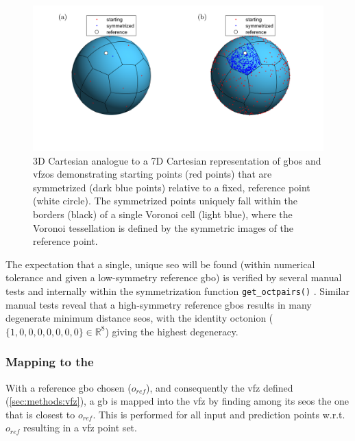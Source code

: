 \documentclass[preprint,12pt]{elsarticle}
\newcommand{\startpt}{red points}
\newcommand{\sympt}{dark blue points}
\newcommand{\refpt}{white circle}
\newcommand{\vbordercolor}{black}
\newcommand{\vcellcolor}{light blue}
\begin{document}
\begin{figure}
    \centering
    \includegraphics[scale=1]{voronoi.png}
    \caption{3D Cartesian analogue to a 7D Cartesian representation of \glspl{gbo} and \glspl{vfzo} demonstrating starting points (\startpt) that are symmetrized (\sympt) relative to a fixed, reference point (\refpt). The symmetrized points uniquely fall within the borders (\vbordercolor) of a single Voronoi cell (\vcellcolor), where the Voronoi tessellation is defined by the symmetric images of the reference point.}
    \label{fig:voronoi}
\end{figure}

The expectation that a single, unique \gls{seo} will be found (within numerical tolerance and given a low-symmetry reference \gls{gbo}) is verified by several manual tests and internally within the symmetrization function \texttt{get\_octpairs()} \cite{bairdFiveDegreeofFreedom5DOF2020}. Similar manual tests reveal that a high-symmetry reference \glspl{gbo} results in many degenerate minimum distance \glspl{seo}, with the identity octonion ($\{1,0,0,0,0,0,0,0\}\in\mathbb{R}^8$) \cite{francisGeodesicOctonionMetric2019} giving the highest degeneracy.

\subsubsection{Mapping  to the }
\label{sec:methods:proj}


With a reference \gls{gbo} chosen ($o_{ref}$), and consequently the \gls{vfz} defined (\cref{sec:methods:vfz}), a \gls{gb} is mapped into the \gls{vfz} by finding among its \glspl{seo} the one that is closest to $o_{ref}$. This is performed for all input and prediction points w.r.t. $o_{ref}$ resulting in a \gls{vfz} point set.
\end{document}
